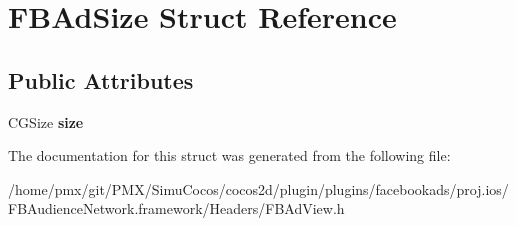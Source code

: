 \hypertarget{structFBAdSize}{}\section{F\+B\+Ad\+Size Struct Reference}
\label{structFBAdSize}
\subsection*{Public Attributes}
\begin{DoxyCompactItemize}
\item 
\mbox{\label{structFBAdSize_aa993c30ebad9520b5d6b56f628aa4bea}} 
C\+G\+Size {\bfseries size}
\end{DoxyCompactItemize}


The documentation for this struct was generated from the following file\+:\begin{DoxyCompactItemize}
\item 
/home/pmx/git/\+P\+M\+X/\+Simu\+Cocos/cocos2d/plugin/plugins/facebookads/proj.\+ios/\+F\+B\+Audience\+Network.\+framework/\+Headers/F\+B\+Ad\+View.\+h\end{DoxyCompactItemize}
